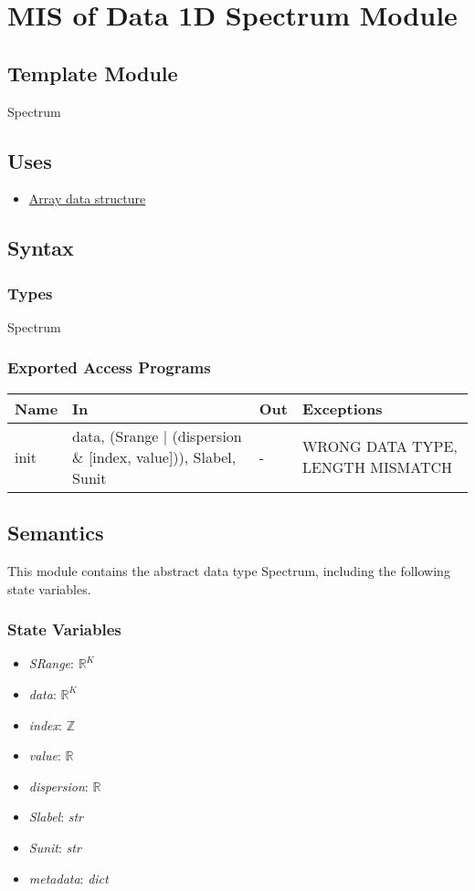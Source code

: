 \documentclass[12pt, titlepage]{article}
\begin{document}
\section{MIS of Data 1D Spectrum Module} \label{Mod:Spectrum}
\subsection{Template Module}
Spectrum

\subsection{Uses}
\begin{itemize}
\item \hyperref[Mod:Array]{Array data structure}
\end{itemize}

\subsection{Syntax}

\subsubsection{Types}
Spectrum

\subsubsection{Exported Access Programs}

\begin{center}
\begin{tabular}{p{1.5cm} p{4cm} p{4cm} p{4cm}}
\toprule
\textbf{Name} & \textbf{In} & \textbf{Out} & \textbf{Exceptions} \\
\midrule
init & data, (Srange $|$ (dispersion $\&$ [index, value])), Slabel, Sunit & - & WRONG DATA TYPE, LENGTH MISMATCH \\
\bottomrule
\end{tabular}
\end{center}

\subsection{Semantics}
This module contains the abstract data type Spectrum, including the following state variables.
\subsubsection{State Variables}
\begin{itemize}
\item \textit{SRange}: $\mathbb{R}^K$
\item \textit{data}: $\mathbb{R}^K$
\item \textit{index}: $\mathbb{Z}$
\item \textit{value}: $\mathbb{R}$
\item \textit{dispersion}: $\mathbb{R}$
\item \textit{Slabel}: \textit{str}
\item \textit{Sunit}: \textit{str}
\item \textit{metadata}: \textit{dict}
\end{itemize}
\end{document}
